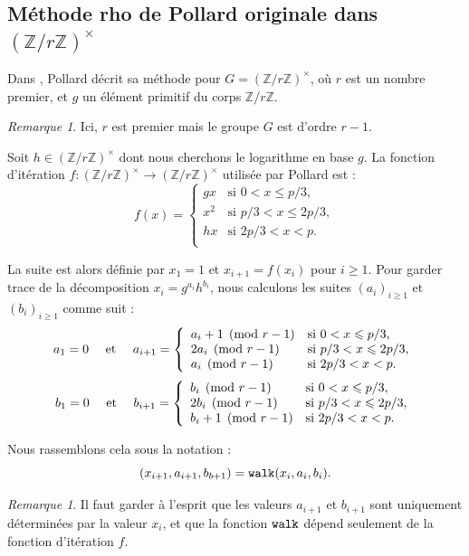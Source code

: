 \documentclass[a4paper, titlepage]{article}
\theoremstyle{definition}
\theoremstyle{remark}
\newtheorem{rema}[theo]{Remarque}
\def\Z{\mathbb Z}
\begin{document}
\subsection{Méthode rho de Pollard originale dans $(\Z/r\Z)^\times$}

Dans \cite{pollard1978}, Pollard décrit sa méthode pour $G = (\Z/r\Z)^\times$, où $r$ est un nombre premier, et $g$ un élément primitif du corps $\Z/r\Z$.

\begin{rema}
Ici, $r$ est premier mais le groupe $G$ est d'ordre $r-1$.
\end{rema}

Soit $h \in (\Z/r\Z)^\times$ dont nous cherchons le logarithme en base $g$. La fonction d'itération $f: (\Z/r\Z)^\times \rightarrow (\Z/r\Z)^\times$ utilisée par Pollard est :
$$f(x) = \left\{\begin{array}{ll}
gx & \text{si } 0 < x \leqslant p/3, \\
x^2 & \text{si } p/3 < x \leqslant 2p/3, \\
hx & \text{si } 2p/3 < x < p. \\
\end{array}\right.$$

La suite est alors définie par $x_1 = 1$ et $x_{i+1} = f(x_i)$ pour $i \geqslant 1$. Pour garder trace de la décomposition $x_i = g^{a_i}h^{b_i}$, nous calculons les suites ${(a_i)}_{i\geqslant 1}$ et ${(b_i)}_{i\geqslant 1}$ comme suit :
$$a_1 = 0 \quad	\text{ et }\quad a_{i+1} = \left\{\begin{array}{l l}
a_i + 1 \pmod{r-1} & \text{si } 0 < x \leqslant p/3, \\
2a_i \pmod{r-1} & \text{si } p/3 < x \leqslant 2p/3, \\
a_i \pmod{r-1} & \text{si } 2p/3 < x < p. \\
\end{array}\right.$$
$$b_1 = 0 \quad	\text{ et }\quad b_{i+1} = \left\{\begin{array}{l l}
b_i \pmod{r-1} & \text{si } 0 < x \leqslant p/3, \\
2b_i \pmod{r-1} & \text{si } p/3 < x \leqslant 2p/3, \\
b_i + 1 \pmod{r-1} & \text{si } 2p/3 < x < p. \\
\end{array}\right.$$

Nous rassemblons cela sous la notation :
$$(x_{i+1}, a_{i+1}, b_{b+1}) = \verb|walk| (x_i, a_i, b_i).$$

\begin{rema}
Il faut garder à l'esprit que les valeurs $a_{i+1}$ et $b_{i+1}$ sont uniquement déterminées par la valeur $x_i$, et que la fonction $\verb|walk|$ dépend seulement de la fonction d'itération $f$.
\end{rema}
\end{document}
